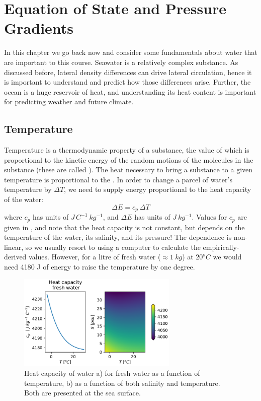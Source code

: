 
\chapter{Equation of State and Pressure Gradients}
\label{chap:EquationofState}

In this chapter we go back now and consider some fundamentals about water that are important to this course.  Seawater is a relatively complex substance.  As discussed before, lateral density differences can drive lateral circulation, hence it is important to understand and predict how those differences arise.  Further, the ocean is a huge reservoir of heat, and understanding its heat content is important for predicting weather and future climate.

\section{Temperature}

Temperature is a thermodynamic property of a substance, the value of which is proportional to the kinetic energy of the random motions of the molecules in the substance (these are called ). The heat necessary to bring a substance to a given temperature is proportional to the \emph{}.  In order to change a parcel of water's temperature by $\Delta T$, we need to supply energy proportional to the heat capacity of the water:
\begin{equation}
   \Delta E = c_p\ \Delta T
\end{equation}
where $c_p$ has units of $J\, C^{-1}\ kg^{-1}$, and $\Delta E$ has units of $J\ kg^{-1}$.  Values for $c_p$ are given in , and note that the heat capacity is not constant, but depends on the temperature of the water, its salinity, and its pressure!  The dependence is non-linear, so we usually resort to using a computer to calculate the empirically-derived values.  However, for a litre of fresh water ($\approx 1\ kg$) at $20^oC$ we would need 4180 J of energy to raise the temperature by one degree.  

\begin{figure}
    \includegraphics[width=3in]{./figs/HeatCapacity.pdf}
    \caption{Heat capacity of water a) for fresh water as a function of temperature, b) as a function of both salinity and temperature.  Both are presented at the sea surface.}
    \label{fig:HeatCapacity}
\end{figure}

